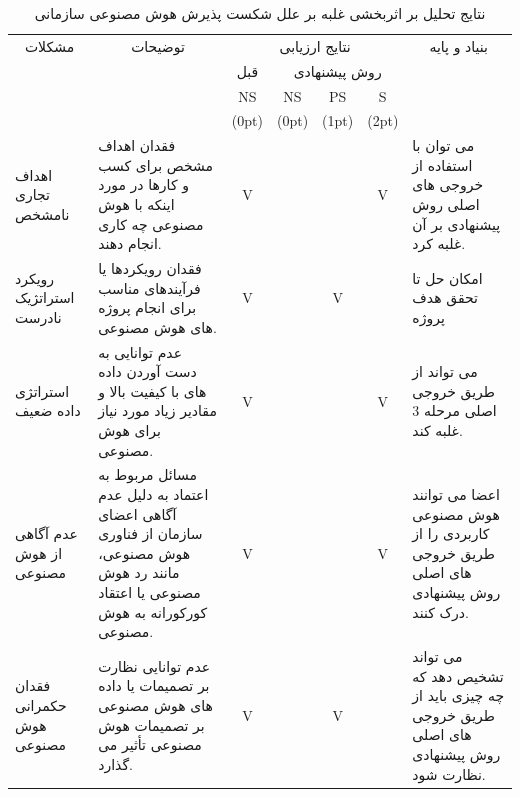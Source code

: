 \documentclass[a4paper,10pt]{article}
\begin{document}
                    \begin{table}
                        
                        \centering
                        \caption{نتایج تحلیل بر اثربخشی غلبه بر علل شکست پذیرش هوش مصنوعی سازمانی}
                        \begin{tabularx}{\textwidth}{ p{1.5cm} p{6.5cm} c c c c p{5.5cm} }

                            \hline

                            \multicolumn{1}{c}{مشکلات} & \multicolumn{1}{c}{توضیحات} & \multicolumn{4}{c}{نتایج ارزیابی} & \multicolumn{1}{c}{بنیاد و پایه} \\
                            &  & قبل & \multicolumn{3}{c}{روش پیشنهادی} &  \\
                            &  & NS & NS & PS & S &  \\
                            &  & (0pt) & (0pt) & (1pt) & (2pt) &  \\

                            \hline

                            اهداف تجاری نامشخص & فقدان اهداف مشخص برای کسب و کارها در مورد اینکه با هوش مصنوعی چه کاری انجام دهند. & V &  &  & V & می توان با استفاده از خروجی های اصلی روش پیشنهادی بر آن غلبه کرد. \\

                            رویکرد استراتژیک نادرست & فقدان رویکردها یا فرآیندهای مناسب برای انجام پروژه های هوش مصنوعی. & V &  & V &  & امکان حل تا تحقق هدف پروژه \\

                            استراتژی داده ضعیف & عدم توانایی به دست آوردن داده های با کیفیت بالا و مقادیر زیاد مورد نیاز برای هوش مصنوعی. & V &  &  & V & می تواند از طریق خروجی اصلی مرحله 3 غلبه کند. \\

                            عدم آگاهی از هوش مصنوعی & مسائل مربوط به اعتماد به دلیل عدم آگاهی اعضای سازمان از فناوری هوش مصنوعی، مانند رد هوش مصنوعی یا اعتقاد کورکورانه به هوش مصنوعی. & V &  &  & V & اعضا می توانند هوش مصنوعی کاربردی را از طریق خروجی های اصلی روش پیشنهادی درک کنند. \\

                            فقدان حکمرانی هوش مصنوعی & عدم توانایی نظارت بر تصمیمات یا داده های هوش مصنوعی بر تصمیمات هوش مصنوعی تأثیر می گذارد. & V &  & V &  & می تواند تشخیص دهد که چه چیزی باید از طریق خروجی های اصلی روش پیشنهادی نظارت شود. \\


\end{tabularx}
\end{table}
\end{document}
